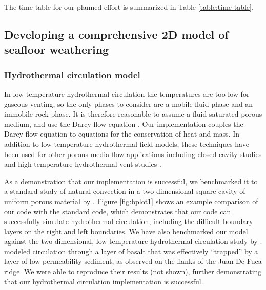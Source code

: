 \documentclass[authoryear,round,12pt]{article}
\begin{document}
The time table for our planned effort is summarized in Table
\ref{table:time-table}.  


\subsection{Developing a comprehensive 2D model of seafloor weathering}
\label{sec:developing}

\subsubsection{Hydrothermal circulation model}
\label{sec:hydrothermal}


In low-temperature hydrothermal circulation the temperatures are too
low for gaseous venting, so the only phases to consider are a mobile
fluid phase and an immobile rock phase. It is therefore reasonable to
assume a fluid-saturated porous medium, and use the Darcy flow
equation \citep{whitaker1985,patankar1980,durran1998,saied2004,
  saied2006}. Our implementation couples the Darcy flow equation to
equations for the conservation of heat and mass. In addition to
low-temperature hydrothermal field models, these techniques have been
used for other porous media flow applications including closed cavity
studies \citep{saied2004, saied2006} and high-temperature hydrothermal
vent studies \citep{wilcock1998, fontaine2007}.

As a demonstration that our implementation is successful, we benchmarked
it to a standard study of natural convection in a two-dimensional
square cavity of uniform porous material by \citet{saied2006}. Figure
\ref{fig:bplot1} shows an example comparison of our code with the
standard code, which demonstrates that our code can successfully
simulate hydrothermal circulation, including the difficult boundary
layers on the right and left boundaries. We have also benchmarked our
model against the two-dimensional, low-temperature hydrothermal
circulation study by \citet{snelgrove1996}. \citet{snelgrove1996}
modeled circulation through a layer of basalt that was effectively
``trapped'' by a layer of low permeability sediment, as observed on
the flanks of the Juan De Fuca ridge. We were able to reproduce their
results (not shown), further demonstrating that our hydrothermal
circulation implementation is successful.

\end{document}
